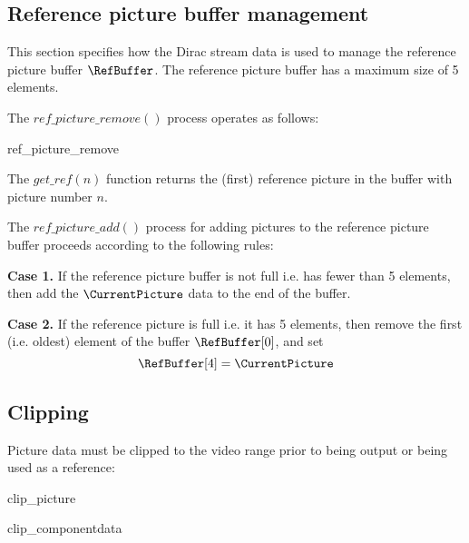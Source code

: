 \subsection{Reference picture buffer management}
\label{refbuffer}

This section specifies how the Dirac stream data is used to manage the reference 
picture buffer $\RefBuffer$. The reference picture buffer has a maximum size of
5 elements.

The $ref\_picture\_remove()$ process operates as
follows:

\begin{pseudo}{ref\_picture\_remove}{}
        \bsEND
    \bsEND
\bsEND
\bsCODE{\RetiredPictureList=\emptyset}
\end{pseudo}

The $get\_ref(n)$ function returns the (first) reference picture in the buffer with 
picture number $n$.  

The $ref\_picture\_add()$ process for adding pictures to the reference picture
buffer proceeds according to the following rules:

{\bf Case 1.} If the reference picture buffer is not full i.e. has fewer than 5 elements,
then add the $\CurrentPicture$ data to the end of the buffer. 

{\bf Case 2.} If the reference picture is full i.e. it has 5 elements, then remove the
first (i.e. oldest) element of the buffer $\RefBuffer[0]$, and set
\[\RefBuffer[4]=\CurrentPicture\]
 
\subsection{Clipping}
\label{pictureclip}

Picture data must be clipped to the video range prior to being output or being
used as a reference:

\begin{pseudo}{clip\_picture}{}
\bsEND
\end{pseudo}

\begin{pseudo}{clip\_component}{data}
     \bsEND
\bsEND
\end{pseudo}
